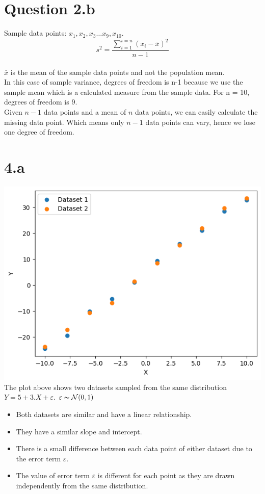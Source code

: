 \documentclass[12pt]{article}
\begin{document}
\section*{Question 2.b}
Sample data points: \(x_1, x_2, x_3 \dots x_9, x_{10}\).
\\
\[s^2 = \frac{\sum_{i=1}^{i=n}(x_i - \bar{x})^2}{n-1}\]
\\
\(\bar{x}\) is the mean of the sample data points and not the population mean.
\\[\baselineskip]
In this case of sample variance, degrees of freedom is n-1 because we use the
sample mean which is a calculated measure from the sample data.
For n = 10, degrees of freedom is 9.
\\[\baselineskip]
Given \(n-1\) data points and a mean of \(n\) data points, we can easily calculate the
missing data point. Which means only \(n-1\) data points can vary, hence we lose
one degree of freedom.

\newpage
\section*{4.a}
\includegraphics*{graph4a}
\\
The plot above shows two datasets sampled from the same distribution
\(Y = 5 + 3.X + \varepsilon\). \(\varepsilon \thicksim \mathcal{N}(0, 1)\)
\\
\begin{itemize}
    \item Both datasets are similar and have a linear relationship.
    \item They have a similar slope and intercept.
    \item There is a small difference between each data point of either dataset
    due to the error term \(\varepsilon\).
    \item The value of error term \(\varepsilon\) is different for each point
    as they are drawn independently from the same distribution.
\end{itemize}
\end{document}
